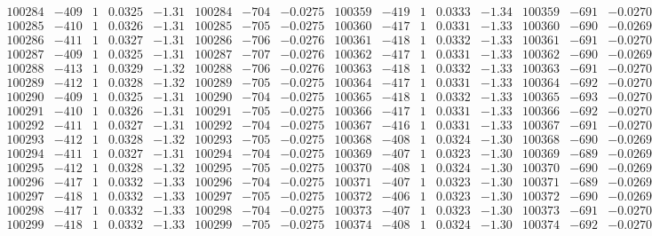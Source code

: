 \documentclass[11pt,reqno,a4letter]{article}
\numberwithin{figure}{section}
\numberwithin{table}{section}
\theoremstyle{plain}
\numberwithin{theorem}{section}
\theoremstyle{definition}
\begin{document}
\begin{table}[ht!]
\begin{equation*}
{\begin{array}{ccccc|ccc||ccccc|ccc}
100284 & -409 & 1 & 0.0325 & -1.31 & 100284 & -704 & -0.0275 & 100359 & -419 & 1 & 0.0333 & -1.34 & 100359 & -691 & -0.0270  \\
100285 & -410 & 1 & 0.0326 & -1.31 & 100285 & -705 & -0.0275 & 100360 & -417 & 1 & 0.0331 & -1.33 & 100360 & -690 & -0.0269  \\
100286 & -411 & 1 & 0.0327 & -1.31 & 100286 & -706 & -0.0276 & 100361 & -418 & 1 & 0.0332 & -1.33 & 100361 & -691 & -0.0270  \\
100287 & -409 & 1 & 0.0325 & -1.31 & 100287 & -707 & -0.0276 & 100362 & -417 & 1 & 0.0331 & -1.33 & 100362 & -690 & -0.0269  \\
100288 & -413 & 1 & 0.0329 & -1.32 & 100288 & -706 & -0.0276 & 100363 & -418 & 1 & 0.0332 & -1.33 & 100363 & -691 & -0.0270  \\
100289 & -412 & 1 & 0.0328 & -1.32 & 100289 & -705 & -0.0275 & 100364 & -417 & 1 & 0.0331 & -1.33 & 100364 & -692 & -0.0270  \\
100290 & -409 & 1 & 0.0325 & -1.31 & 100290 & -704 & -0.0275 & 100365 & -418 & 1 & 0.0332 & -1.33 & 100365 & -693 & -0.0270  \\
100291 & -410 & 1 & 0.0326 & -1.31 & 100291 & -705 & -0.0275 & 100366 & -417 & 1 & 0.0331 & -1.33 & 100366 & -692 & -0.0270  \\
100292 & -411 & 1 & 0.0327 & -1.31 & 100292 & -704 & -0.0275 & 100367 & -416 & 1 & 0.0331 & -1.33 & 100367 & -691 & -0.0270  \\
100293 & -412 & 1 & 0.0328 & -1.32 & 100293 & -705 & -0.0275 & 100368 & -408 & 1 & 0.0324 & -1.30 & 100368 & -690 & -0.0269  \\
100294 & -411 & 1 & 0.0327 & -1.31 & 100294 & -704 & -0.0275 & 100369 & -407 & 1 & 0.0323 & -1.30 & 100369 & -689 & -0.0269  \\
100295 & -412 & 1 & 0.0328 & -1.32 & 100295 & -705 & -0.0275 & 100370 & -408 & 1 & 0.0324 & -1.30 & 100370 & -690 & -0.0269  \\
100296 & -417 & 1 & 0.0332 & -1.33 & 100296 & -704 & -0.0275 & 100371 & -407 & 1 & 0.0323 & -1.30 & 100371 & -689 & -0.0269  \\
100297 & -418 & 1 & 0.0332 & -1.33 & 100297 & -705 & -0.0275 & 100372 & -406 & 1 & 0.0323 & -1.30 & 100372 & -690 & -0.0269  \\
100298 & -417 & 1 & 0.0332 & -1.33 & 100298 & -704 & -0.0275 & 100373 & -407 & 1 & 0.0323 & -1.30 & 100373 & -691 & -0.0270  \\
100299 & -418 & 1 & 0.0332 & -1.33 & 100299 & -705 & -0.0275 & 100374 & -408 & 1 & 0.0324 & -1.30 & 100374 & -692 & -0.0270  \\

\end{array}}
\end{equation*}
\end{table}
\end{document}
